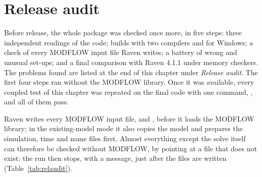 \section{Release audit}\label{sec:relaudit}
\begin{plain}
Before release, the whole package was checked once more, in five steps: three independent readings of the code; builds with
two compilers and for Windows; a check of every MODFLOW input file Raven writes; a battery of wrong and unusual set-ups; and
a final comparison with Raven 4.1.1 under memory checkers. The problems found are listed at the end of this chapter under
\emph{Release audit}. The first four steps ran without the MODFLOW library. Once it was available, every coupled test of this
chapter was repeated on the final code with one command, , and all of them pass.
\end{plain}
Raven writes every MODFLOW input file, and , before it loads the MODFLOW library; in the
existing-model mode it also copies the model and prepares the simulation, time and name files first. Almost everything
except the solve itself can therefore be checked without MODFLOW, by pointing  at a file that does not
exist: the run then stops, with a message, just after the files are written (Table~\ref{tab:relaudit}).

